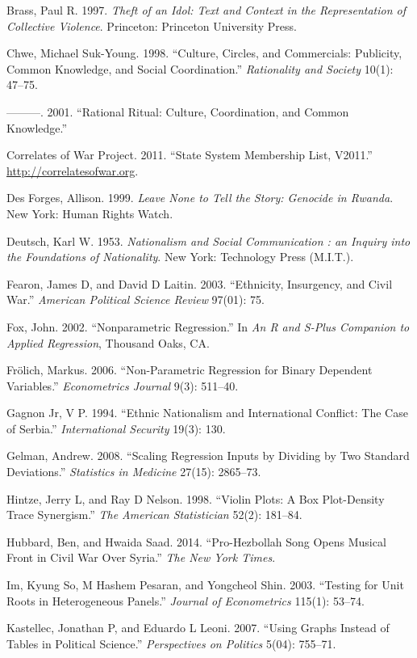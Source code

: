 \documentclass[11pt,article,oneside]{memoir}
\begin{document}
Brass, Paul R. 1997. \emph{Theft of an Idol: Text and Context in the
Representation of Collective Violence}. Princeton: Princeton University
Press.

Chwe, Michael Suk-Young. 1998. ``Culture, Circles, and Commercials:
Publicity, Common Knowledge, and Social Coordination.''
\emph{Rationality and Society} 10(1): 47--75.

---------. 2001. ``Rational Ritual: Culture, Coordination, and Common
Knowledge.''

Correlates of War Project. 2011. ``State System Membership List,
V2011.'' \url{http://correlatesofwar.org}.

Des Forges, Allison. 1999. \emph{Leave None to Tell the Story: Genocide
in Rwanda}. New York: Human Rights Watch.

Deutsch, Karl W. 1953. \emph{Nationalism and Social Communication : an
Inquiry into the Foundations of Nationality}. New York: Technology Press
(M.I.T.).

Fearon, James D, and David D Laitin. 2003. ``Ethnicity, Insurgency, and
Civil War.'' \emph{American Political Science Review} 97(01): 75.

Fox, John. 2002. ``Nonparametric Regression.'' In \emph{An R and S-Plus
Companion to Applied Regression}, Thousand Oaks, CA.

Fr{ö}lich, Markus. 2006. ``Non-Parametric Regression for Binary
Dependent Variables.'' \emph{Econometrics Journal} 9(3): 511--40.

Gagnon Jr, V P. 1994. ``Ethnic Nationalism and International Conflict:
The Case of Serbia.'' \emph{International Security} 19(3): 130.

Gelman, Andrew. 2008. ``Scaling Regression Inputs by Dividing by Two
Standard Deviations.'' \emph{Statistics in Medicine} 27(15): 2865--73.

Hintze, Jerry L, and Ray D Nelson. 1998. ``Violin Plots: A Box
Plot-Density Trace Synergism.'' \emph{The American Statistician} 52(2):
181--84.

Hubbard, Ben, and Hwaida Saad. 2014. ``Pro-Hezbollah Song Opens Musical
Front in Civil War Over Syria.'' \emph{The New York Times}.

Im, Kyung So, M Hashem Pesaran, and Yongcheol Shin. 2003. ``Testing for
Unit Roots in Heterogeneous Panels.'' \emph{Journal of Econometrics}
115(1): 53--74.

Kastellec, Jonathan P, and Eduardo L Leoni. 2007. ``Using Graphs Instead
of Tables in Political Science.'' \emph{Perspectives on Politics} 5(04):
755--71.
\end{document}
